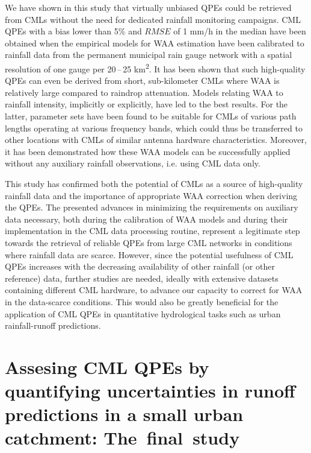 \documentclass{ctuthesis}\usepackage[]{graphicx}\usepackage[]{color}
\begin{document}
We have shown in this study that virtually unbiased QPEs could be retrieved from CMLs without the need for dedicated rainfall monitoring campaigns. CML QPEs with a bias lower than 5\% and $R\!M\!S\!E$ of 1 mm/h in the median have been obtained when the empirical models for WAA estimation have been calibrated to rainfall data from the permanent municipal rain gauge network with a spatial resolution of one gauge per 20\,--\,25 km\textsuperscript{2}. It has been shown that such high-quality QPEs can even be derived from short, sub-kilometer CMLs where WAA is relatively large compared to raindrop attenuation. Models relating WAA to rainfall intensity, implicitly or explicitly, have led to the best results. For the latter, parameter sets have been found to be suitable for CMLs of various path lengths operating at various frequency bands, which could thus be transferred to other locations with CMLs of similar antenna hardware characteristics. Moreover, it has been demonstrated how these WAA models can be successfully applied without any auxiliary rainfall observations, i.e. using CML data only.

This study has confirmed both the potential of CMLs as a source of high-quality rainfall data and the importance of appropriate WAA correction when deriving the QPEs. The presented advances in minimizing the requirements on auxiliary data necessary, both during the calibration of WAA models and during their implementation in the CML data processing routine, represent a legitimate step towards the retrieval of reliable QPEs from large CML networks in conditions where rainfall data are scarce. However, since the potential usefulness of CML QPEs increases with the decreasing availability of other rainfall (or other reference) data, further studies are needed, ideally with extensive datasets containing different CML hardware, to advance our capacity to correct for WAA in the data-scarce conditions. This would also be greatly beneficial for the application of CML QPEs in quantitative hydrological tasks such as urban rainfall-runoff predictions.




        


\chapter{Assesing CML QPEs by quantifying uncertainties in runoff predictions in a small urban catchment: The~final~study} \label{chap7}
\end{document}
